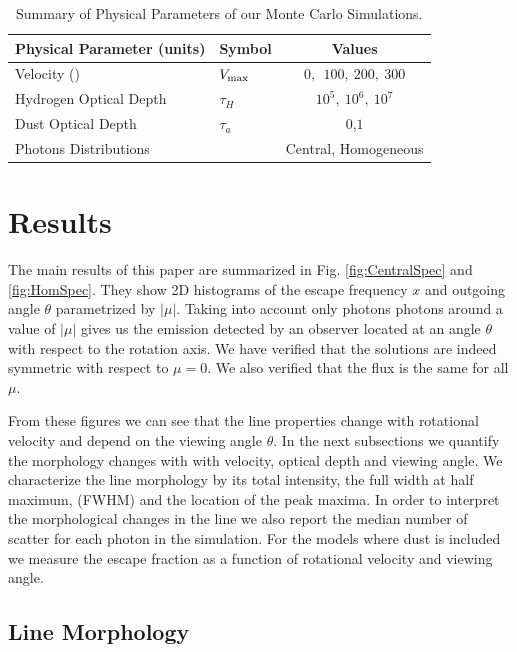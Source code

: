 \documentclass{emulateapj}
\newcommand{\ly}{{\ifmmode{{\rm Ly}\alpha~}\else{Ly$\alpha$~}\fi}}
\newcommand{\kms}{{\ifmmode{{\mathrm{\,km\ s}^{-1}}}\else{\,km~s$^{-1}$}\fi}}
\begin{document}
\begin{table}
\begin{center}
\begin{tabular}{llc}\hline\hline
Physical Parameter (units) & Symbol & Values\\\hline
Velocity (\kms) & $V_{\rm max}$&$0,\ \ 100,\ 200,\ 300$\\
Hydrogen Optical Depth & $\tau_{H} $ & $10^{5},\ 10^{6},\ 10^{7}$\\
Dust Optical Depth & $\tau_{a}$ & $0$,$1$\\
Photons Distributions & & Central, Homogeneous\\\hline\hline
\end{tabular}
\caption{
  Summary of Physical Parameters of our Monte Carlo Simulations.} 
\label{table:models}
\end{center}
\end{table}




\section{Results}
\label{sec:results}

The main results of this paper are summarized in Fig.
\ref{fig:CentralSpec} and \ref{fig:HomSpec}. 
They show 2D histograms of the escape frequency $x$ and outgoing angle
$\theta$ parametrized by $|\mu|$. 
Taking into account only photons photons around a value
of $|\mu|$ gives us the emission detected by an observer located at an
angle $\theta$ with respect to the rotation axis. 
We have verified that the solutions are indeed symmetric with respect
to $\mu=0$. We also verified that the flux is the same for all $\mu$.

From these figures we can see that the line properties change with
rotational velocity and depend on the viewing angle $\theta$.  
In the next subsections we quantify the morphology changes with with
velocity, optical depth and viewing angle.  
We characterize the line morphology by its total intensity, the full
width at half maximum, (FWHM) and the location of the peak maxima. 
In order to interpret the
morphological changes in the line we also report the median number of
scatter for each \ly photon in the simulation. 
For the models where dust is included we measure the escape fraction
as a function of rotational velocity and viewing angle.   

\subsection{Line Morphology}
\label{sec:angles}
\end{document}
